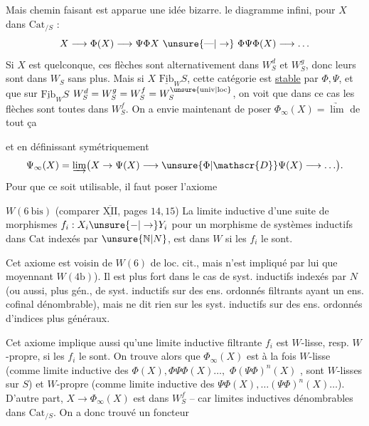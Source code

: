 Mais chemin faisant est apparue une idée bizarre.  le  diagramme infini, pour $X$ dans $\mathrm{Cat}_{/S}$  :
\[
X\longrightarrow\Phi(X)\longrightarrow\Psi\Phi X\ \unsure{\text{---}|\to}\ \Phi\Psi\Phi(X)\longrightarrow\ldots
\]
Si $X$ est quelconque, ces flèches sont alternativement dans $W_S^d$ et $W_S^g$, donc leurs  sont dans $W_S$ sans plus. Mais si $X$   $\underline{\mathrm{Fib}}_W S$,   cette catégorie est \uline{stable} par $\Phi,\Psi$, et que sur $\underline{\mathrm{Fib}}_W S$ $W_S^d=W_S^g=W_S^f=W_S^{\unsure{\mathrm{univ}|\mathrm{loc}}}$, on voit que dans ce cas les flèches sont toutes dans $W_S^f$.  On a envie maintenant de poser $\Phi_\infty(X)=\underrightarrow{\lim}$ de tout ça

et en définissant symétriquement
\[
\Psi_\infty(X)=\underrightarrow{\lim}\bigl(X\to\Psi(X)\longrightarrow\unsure{\Phi|\mathscr{D}}\Psi(X)\longrightarrow\ldots\bigr).
\]
Pour que ce soit utilisable, il faut poser l'axiome

\uline{$W(6\ \mathrm{bis})$} (comparer $\overline{\underline{\mathrm{XII}}}$, pages $14,15$) La limite inductive d'une suite de morphismes $f_i:X_i\unsure{\mathbin{-}|\to}Y_i$  pour un morphisme de systèmes inductifs dans $\mathrm{Cat}$ indexés par $\unsure{\mathbb N|N}$, est dans $W$ si les $f_i$ le sont.

Cet axiome est voisin de $W(6)$ de loc. cit., mais n'est impliqué par lui que moyennant $W(4\mathrm b)$). Il est plus fort dans le cas de syst. inductifs indexés par $N$ (ou aussi, plus gén., de syst. inductifs sur des ens. ordonnés filtrants ayant un ens. cofinal dénombrable), mais ne dit rien sur les syst. inductifs sur des ens. ordonnés d'indices plus généraux.

Cet axiome implique aussi qu'une limite inductive filtrante    $f_i$ est $W$-lisse, resp. $W$-propre, si les $f_i$ le sont.  On trouve alors que $\Phi_\infty(X)$ est à la fois $W$-lisse (comme limite inductive des $\Phi(X),\Phi\Psi\Phi(X)\ldots,$ $\Phi(\Psi\Phi)^n(X)$ ,   sont $W$-lisses sur $S$) et $W$-propre (comme limite inductive des $\Psi\Phi(X),\ldots(\Psi\Phi)^n(X)\ldots$).  D'autre part, $X\longrightarrow\Phi_\infty(X)$ est dans $W_S^f$ -- car   limites inductives  dénombrables dans $\mathrm{Cat}_{/S}$. On a donc trouvé un foncteur

